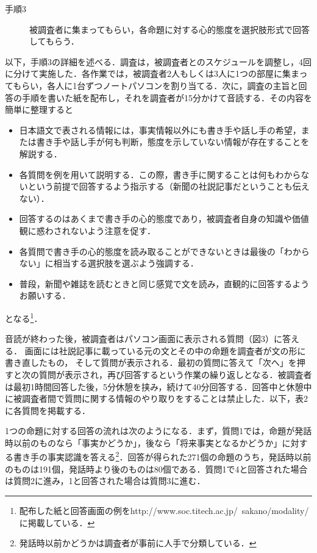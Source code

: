 \documentclass[japanese]{jnlp_1.4}
\begin{document}
\begin{description}
\item[手順3] \gt 被調査者に集まってもらい，各命題に対する心的態度を選択肢形式で回答してもらう．
\end{description}

以下，手順3の詳細を述べる．調査は，被調査者とのスケジュールを調整し，4回に分けて実施した．各作業では，被調査者2人もしくは3人に1つの部屋に集まってもらい，各人に1台ずつノートパソコンを割り当てる．次に，調査の主旨と回答の手順を書いた紙を配布し，それを調査者が15分かけて音読する．その内容を簡単に整理すると
\begin{itemize}
\item 日本語文で表される情報には，事実情報以外にも書き手や話し手の希望，または書き手や話し手が何も判断，態度を示していない情報が存在することを解説する．
\item 各質問を例を用いて説明する．この際，書き手に関することは何もわからないという前提で回答するよう指示する（新聞の社説記事だということも伝えない）．
\item 回答するのはあくまで書き手の心的態度であり，被調査者自身の知識や価値観に惑わされないよう注意を促す．
\item 各質問で書き手の心的態度を読み取ることができないときは最後の「わからない」に相当する選択肢を選ぶよう強調する．
\item 普段，新聞や雑誌を読むときと同じ感覚で文を読み，直観的に回答するようお願いする．
\end{itemize}
となる\footnote{配布した紙と回答画面の例をhttp://www.soc.titech.ac.jp/~sakano/modality/に掲載している．}．

音読が終わった後，被調査者はパソコン画面に表示される質問（図3）に答える．
画面には社説記事に載っている元の文とその中の命題を調査者が文の形に書き直したもの，
そして質問が表示される．最初の質問に答えて「次へ」を押すと次の質問が表示され，再び回答するという作業の繰り返しとなる．被調査者は最初1時間回答した後，5分休憩を挟み，続けて40分回答する．回答中と休憩中に被調査者間で質問に関する情報のやり取りをすることは禁止した．以下，表2に各質問を掲載する．



1つの命題に対する回答の流れは次のようになる．まず，質問1では，命題が発話時以前のものなら「事実かどうか」，後なら「将来事実となるかどうか」に対する書き手の事実認識を答える\footnote{発話時以前かどうかは調査者が事前に人手で分類している．}．回答が得られた271個の命題のうち，発話時以前のものは191個，発話時より後のものは80個である．質問1で4と回答された場合は質問2に進み，1と回答された場合は質問3に進む．
\end{document}
